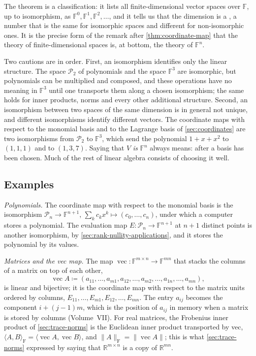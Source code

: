 The theorem is a classification: it lists all finite-dimensional vector spaces over $\mathbb F$, up to isomorphism, as $\mathbb F^0,\mathbb F^1,\mathbb F^2,\ldots$, and it tells us that the dimension is a , a number that is the same for isomorphic spaces and different for non-isomorphic ones. It is the precise form of the remark after \cref{thm:coordinate-map} that the theory of finite-dimensional spaces is, at bottom, the theory of $\mathbb F^n$.

Two cautions are in order. First, an isomorphism identifies only the linear structure. The space $\mathcal P_2$ of polynomials and the space $\mathbb F^3$ are isomorphic, but polynomials can be multiplied and composed, and these operations have no meaning in $\mathbb F^3$ until one transports them along a chosen isomorphism; the same holds for inner products, norms and every other additional structure. Second, an isomorphism between two spaces of the same dimension is in general not unique, and different isomorphisms identify different vectors. The coordinate maps with respect to the monomial basis and to the Lagrange basis of \cref{sec:coordinates} are two isomorphisms from $\mathcal P_2$ to $\mathbb F^3$, which send the polynomial $1+x+x^2$ to $(1,1,1)$ and to $(1,3,7)$. Saying that $V$ \emph{is} $\mathbb F^n$ always means: after a basis has been chosen. Much of the rest of linear algebra consists of choosing it well.

\subsection{Examples}

\emph{Polynomials.} The coordinate map with respect to the monomial basis is the isomorphism $\mathcal P_n\to\mathbb F^{n+1}$, $\sum_kc_kx^k\mapsto(c_0,\ldots,c_n)$, under which a computer stores a polynomial. The evaluation map $E\colon\mathcal P_n\to\mathbb F^{n+1}$ at $n+1$ distinct points is another isomorphism, by \cref{sec:rank-nullity-applications}, and it stores the polynomial by its values.

\emph{Matrices and the vec map.} The map $\operatorname{vec}\colon\mathbb F^{m\times n}\to\mathbb F^{mn}$ that stacks the columns of a matrix on top of each other,
\[
\operatorname{vec}A\coloneqq(a_{11},\ldots,a_{m1},a_{12},\ldots,a_{m2},\ldots,a_{1n},\ldots,a_{mn}),
\]
is linear and bijective; it is the coordinate map with respect to the matrix units ordered by columns, $E_{11},\ldots,E_{m1},E_{12},\ldots,E_{mn}$. The entry $a_{ij}$ becomes the component $i+(j-1)m$, which is the position of $a_{ij}$ in memory when a matrix is stored by columns (Volume~VII). For real matrices, the Frobenius inner product of \cref{sec:trace-norms} is the Euclidean inner product transported by vec, $\langle A,B\rangle_{\mathrm F}=\langle\operatorname{vec}A,\operatorname{vec}B\rangle$, and $\|A\|_{\mathrm F}=\|\operatorname{vec}A\|$; this is what \cref{sec:trace-norms} expressed by saying that $\mathbb R^{m\times n}$ is a copy of $\mathbb R^{mn}$.

